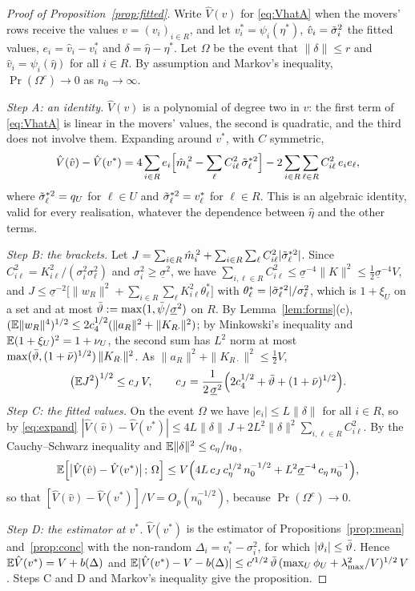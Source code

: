 \begin{proof}[Proof of Proposition~\ref{prop:fitted}]
Write $\hat V(v)$ for \eqref{eq:VhatA} when the movers' rows receive the values $v=(v_i)_{i\in R}$, and let
$v^*_i=\psi_i(\eta^*)$, $\hat v_i=\tilde\sigma_i^2$ the fitted values, $e_i=\hat v_i-v^*_i$ and $\delta=\hat\eta-\eta^*$. Let
$\Omega$ be the event that $\|\delta\|\le r$ and $\hat v_i=\psi_i(\hat\eta)$ for all $i\in R$. By assumption and
Markov's inequality, $\Pr(\Omega^c)\to0$ as $n_0\to\infty$.

\emph{Step A: an identity.} $\hat V(v)$ is a polynomial of degree two in $v$: the first term of
\eqref{eq:VhatA} is linear in the movers' values, the second is quadratic, and the third does not involve them.
Expanding around $v^*$, with $C$ symmetric,
\begin{equation}\label{eq:expand}
\hat V(\hat v)-\hat V(v^*)=4\sum_{i\in R}e_i\Big[\hat m_i^{\,2}-\sum_\ell C_{i\ell}^2\,\tilde\sigma_\ell^{*2}\Big]
-2\sum_{i\in R}\sum_{\ell\in R}C_{i\ell}^2\,e_ie_\ell ,
\end{equation}
where $\tilde\sigma_\ell^{*2}=q_U$ for $\ell\in U$ and $\tilde\sigma_\ell^{*2}=v^*_\ell$ for $\ell\in R$. This is an algebraic
identity, valid for every realisation, whatever the dependence between $\hat\eta$ and the other terms.

\emph{Step B: the brackets.} Let $J=\sum_{i\in R}\hat m_i^{\,2}+\sum_{i\in R}\sum_\ell C_{i\ell}^2|\tilde\sigma_\ell^{*2}|$.
Since $C_{i\ell}^2=K_{i\ell}^2/(\sigma_i^2\sigma_\ell^2)$ and $\sigma_i^2\ge\underline\sigma^2$, we have
$\sum_{i,\ell\in R}C_{i\ell}^2\le\underline\sigma^{-4}\|K\|^2\le\frac12\underline\sigma^{-4}V$, and
$J\le\underline\sigma^{-2}\big[\|w_R\|^2+\sum_{i\in R}\sum_\ell K_{i\ell}^2\theta^*_\ell\big]$ with
$\theta^*_\ell=|\tilde\sigma_\ell^{*2}|/\sigma_\ell^2$, which is $1+\xi_U$ on a set and at most
$\bar\vartheta:=\max(1,\bar\psi/\underline\sigma^2)$ on $R$. By Lemma~\ref{lem:forms}(c),
$(\mathbb{E}\|w_R\|^4)^{1/2}\le2c_4^{1/2}(\|a_R\|^2+\|K_{R\cdot}\|^2)$; by Minkowski's inequality and
$\mathbb{E}(1+\xi_U)^2=1+\nu_U$, the second sum has $L^2$ norm at most $\max(\bar\vartheta,(1+\bar\nu)^{1/2})\,\|K_{R\cdot}\|^2$. As
$\|a_R\|^2+\|K_{R\cdot}\|^2\le\frac12V$,
\[
\big(\mathbb{E} J^2\big)^{1/2}\le c_J\,V,\qquad c_J=\frac{1}{2\,\underline\sigma^2}\Big(2c_4^{1/2}+\bar\vartheta+(1+\bar\nu)^{1/2}\Big).
\]
\emph{Step C: the fitted values.} On the event $\Omega$ we have $|e_i|\le L\|\delta\|$ for all
$i\in R$, so by \eqref{eq:expand}
$|\hat V(\hat v)-\hat V(v^*)|\le4L\|\delta\|\,J+2L^2\|\delta\|^2\sum_{i,\ell\in R}C_{i\ell}^2$. By the
Cauchy--Schwarz inequality and $\mathbb{E}\|\delta\|^2\le c_\eta/n_0$,
\[
\mathbb{E}\Big[\big|\hat V(\hat v)-\hat V(v^*)\big|\,;\,\Omega\Big]\le V\Big(4L\,c_J\,c_\eta^{1/2}\,n_0^{-1/2}+L^2\underline\sigma^{-4}\,c_\eta\,n_0^{-1}\Big),
\]
so that $[\hat V(\hat v)-\hat V(v^*)]/V=O_p(n_0^{-1/2})$, because $\Pr(\Omega^c)\to0$.

\emph{Step D: the estimator at $v^*$.} $\hat V(v^*)$ is the estimator of Propositions~\ref{prop:mean}
and~\ref{prop:conc} with the non-random $\Delta_i=v^*_i-\sigma_i^2$, for which $|\vartheta_i|\le\bar\vartheta$. Hence
$\mathbb{E}\hat V(v^*)=V+b(\Delta)$ and
$\mathbb{E}|\hat V(v^*)-V-b(\Delta)|\le c'^{1/2}\,\bar\vartheta\,(\max_U\phi_U+\lambda_{\max}^2/V)^{1/2}\,V$. Steps C and D and
Markov's inequality give the proposition.
\end{proof}


